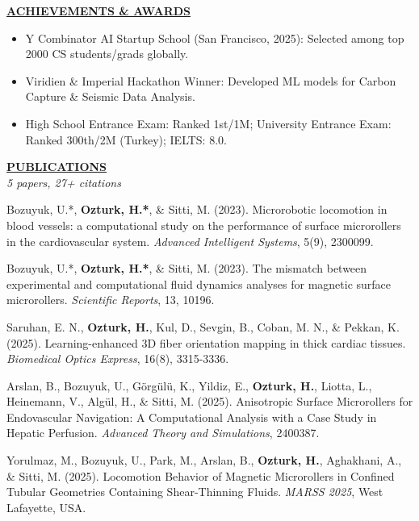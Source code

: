 \documentclass{article}
\newlength{\remaining}
\renewcommand{\section}[1]{
  \vspace{1.0em}\setlength{\remaining}{\textwidth-\widthof{\uppercase{#1}}}
    \noindent\underline{\fontsize{10}{15}\bfseries\uppercase{#1}\hspace*{\remaining}} \\
}
\begin{document}
\section{Achievements \& Awards}
\vspace{-1.25em}
\begin{itemize}
    \item Y Combinator AI Startup School (San Francisco, 2025): Selected among top 2000 CS students/grads globally.
    \item Viridien \& Imperial Hackathon Winner: Developed ML models for Carbon Capture \& Seismic Data Analysis.
    \item High School Entrance Exam: Ranked 1st/1M; University Entrance Exam: Ranked 300th/2M (Turkey); IELTS: 8.0.
    \end{itemize}

\newpage

\section{Publications}
\noindent\textit{5 papers, 27+ citations}
\vspace{0.75em}

Bozuyuk, U.*, \textbf{Ozturk, H.*}, \& Sitti, M. (2023). Microrobotic locomotion in blood vessels: a computational study on the performance of surface microrollers in the cardiovascular system. \textit{Advanced Intelligent Systems}, 5(9), 2300099.

Bozuyuk, U.*, \textbf{Ozturk, H.*}, \& Sitti, M. (2023). The mismatch between experimental and computational fluid dynamics analyses for magnetic surface microrollers. \textit{Scientific Reports}, 13, 10196.

Saruhan, E. N., \textbf{Ozturk, H.}, Kul, D., Sevgin, B., Coban, M. N., \& Pekkan, K. (2025). Learning-enhanced 3D fiber orientation mapping in thick cardiac tissues. \textit{Biomedical Optics Express}, 16(8), 3315-3336.

Arslan, B., Bozuyuk, U., Görgülü, K., Yildiz, E., \textbf{Ozturk, H.}, Liotta, L., Heinemann, V., Algül, H., \& Sitti, M. (2025). Anisotropic Surface Microrollers for Endovascular Navigation: A Computational Analysis with a Case Study in Hepatic Perfusion. \textit{Advanced Theory and Simulations}, 2400387.

Yorulmaz, M., Bozuyuk, U., Park, M., Arslan, B., \textbf{Ozturk, H.}, Aghakhani, A., \& Sitti, M. (2025). Locomotion Behavior of Magnetic Microrollers in Confined Tubular Geometries Containing Shear-Thinning Fluids. \textit{MARSS 2025}, West Lafayette, USA.
\end{document}
